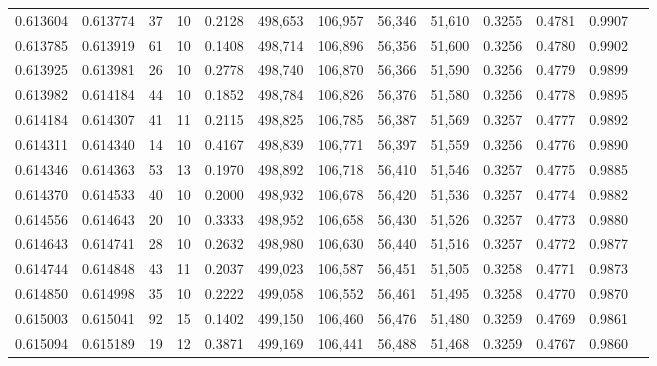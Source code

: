 \begin{tabular}{rrrrrrrrrrrrr}
0.613604 & 0.613774 &    37 &  10 &                                     0.2128 & 498,653 & 106,957 &  56,346 &  51,610 & 0.3255 & 0.4781 & 0.9907 \\
0.613785 & 0.613919 &    61 &  10 &                                     0.1408 & 498,714 & 106,896 &  56,356 &  51,600 & 0.3256 & 0.4780 & 0.9902 \\
0.613925 & 0.613981 &    26 &  10 &                                     0.2778 & 498,740 & 106,870 &  56,366 &  51,590 & 0.3256 & 0.4779 & 0.9899 \\
0.613982 & 0.614184 &    44 &  10 &                                     0.1852 & 498,784 & 106,826 &  56,376 &  51,580 & 0.3256 & 0.4778 & 0.9895 \\
0.614184 & 0.614307 &    41 &  11 &                                     0.2115 & 498,825 & 106,785 &  56,387 &  51,569 & 0.3257 & 0.4777 & 0.9892 \\
0.614311 & 0.614340 &    14 &  10 &                                     0.4167 & 498,839 & 106,771 &  56,397 &  51,559 & 0.3256 & 0.4776 & 0.9890 \\
0.614346 & 0.614363 &    53 &  13 &                                     0.1970 & 498,892 & 106,718 &  56,410 &  51,546 & 0.3257 & 0.4775 & 0.9885 \\
0.614370 & 0.614533 &    40 &  10 &                                     0.2000 & 498,932 & 106,678 &  56,420 &  51,536 & 0.3257 & 0.4774 & 0.9882 \\
0.614556 & 0.614643 &    20 &  10 &                                     0.3333 & 498,952 & 106,658 &  56,430 &  51,526 & 0.3257 & 0.4773 & 0.9880 \\
0.614643 & 0.614741 &    28 &  10 &                                     0.2632 & 498,980 & 106,630 &  56,440 &  51,516 & 0.3257 & 0.4772 & 0.9877 \\
0.614744 & 0.614848 &    43 &  11 &                                     0.2037 & 499,023 & 106,587 &  56,451 &  51,505 & 0.3258 & 0.4771 & 0.9873 \\
0.614850 & 0.614998 &    35 &  10 &                                     0.2222 & 499,058 & 106,552 &  56,461 &  51,495 & 0.3258 & 0.4770 & 0.9870 \\
0.615003 & 0.615041 &    92 &  15 &                                     0.1402 & 499,150 & 106,460 &  56,476 &  51,480 & 0.3259 & 0.4769 & 0.9861 \\
0.615094 & 0.615189 &    19 &  12 &                                     0.3871 & 499,169 & 106,441 &  56,488 &  51,468 & 0.3259 & 0.4767 & 0.9860 \\

\end{tabular}
